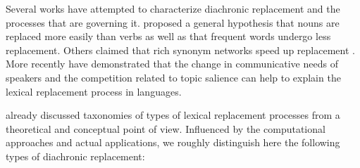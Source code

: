 \documentclass[output=paper]{langsci/langscibook}
\begin{document}
Several works have attempted to characterize diachronic replacement and the processes that are governing it. \citet{pagel2007frequency} proposed a general hypothesis that nouns are replaced more easily than verbs as well as that frequent words undergo less replacement. Others claimed that rich synonym networks speed up replacement
\citep{vejdemo2016semantic}. 
More recently \citet{karjus2020communicative} have demonstrated that the change in communicative needs of speakers and the competition related to topic salience can help to explain the lexical replacement process in languages. 
 
\citet{ullmann1959principles} already discussed taxonomies of types of lexical replacement processes from a theoretical and conceptual point of view. Influenced by the computational approaches and actual applications, we roughly distinguish here the following types of diachronic replacement: 
\end{document}
